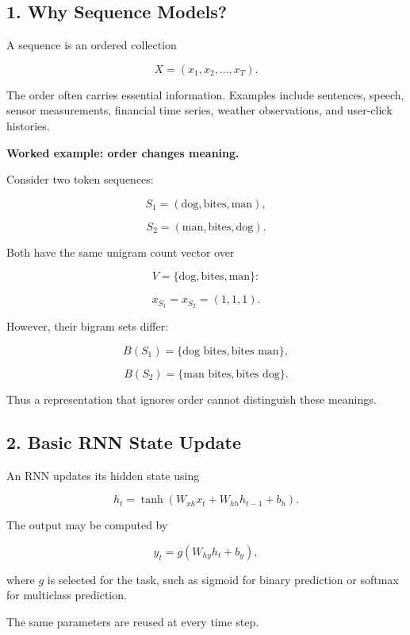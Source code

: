 \documentclass[11pt,a4paper,twoside]{article}
\begin{document}
\subsection*{1. Why Sequence Models?}

A sequence is an ordered collection

\[
X=(x_1,x_2,\ldots,x_T).
\]

The order often carries essential information. Examples include sentences, speech, sensor measurements, financial time series, weather observations, and user-click histories.

\textbf{Worked example: order changes meaning.}

Consider two token sequences:

\[
S_1=(\text{dog},\text{bites},\text{man}),
\]

\[
S_2=(\text{man},\text{bites},\text{dog}).
\]

Both have the same unigram count vector over

\[
V=\{\text{dog},\text{bites},\text{man}\}:
\]

\[
x_{S_1}=x_{S_2}=(1,1,1).
\]

However, their bigram sets differ:

\[
B(S_1)=\{\text{dog bites},\text{bites man}\},
\]

\[
B(S_2)=\{\text{man bites},\text{bites dog}\}.
\]

Thus a representation that ignores order cannot distinguish these meanings.

\subsection*{2. Basic RNN State Update}

An RNN updates its hidden state using

\[
\boxed{h_t=\tanh(W_{xh}x_t+W_{hh}h_{t-1}+b_h)}.
\]

The output may be computed by

\[
\boxed{\hat y_t=g(W_{hy}h_t+b_y)},
\]

where $g$ is selected for the task, such as sigmoid for binary prediction or softmax for multiclass prediction.

The same parameters are reused at every time step.

\begin{center}
\end{center}
\end{document}
